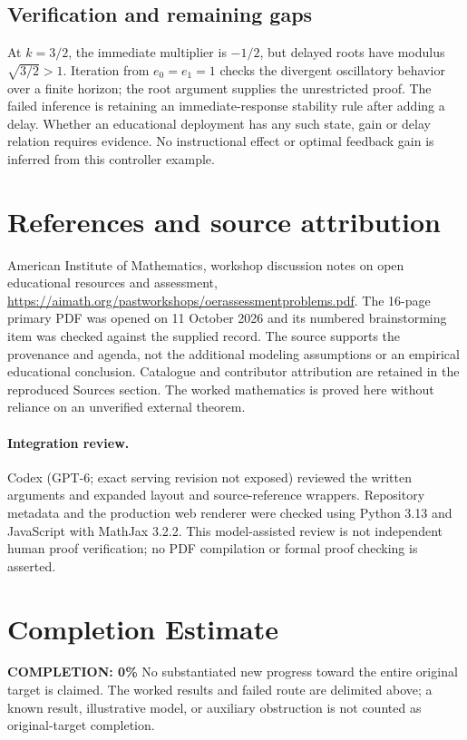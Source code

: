 \documentclass[11pt]{article}
\begin{document}
\subsection{Verification and remaining gaps}
At $k=3/2$, the immediate multiplier is $-1/2$, but delayed roots have modulus $\sqrt{3/2}>1$. Iteration from $e_0=e_1=1$ checks the divergent oscillatory behavior over a finite horizon; the root argument supplies the unrestricted proof. The failed inference is retaining an immediate-response stability rule after adding a delay. Whether an educational deployment has any such state, gain or delay relation requires evidence. No instructional effect or optimal feedback gain is inferred from this controller example.

\section{References and source attribution}
American Institute of Mathematics, workshop discussion notes on open educational resources and assessment, \url{https://aimath.org/pastworkshops/oerassessmentproblems.pdf}. The 16-page primary PDF was opened on 11 October 2026 and its numbered brainstorming item was checked against the supplied record. The source supports the provenance and agenda, not the additional modeling assumptions or an empirical educational conclusion. Catalogue and contributor attribution are retained in the reproduced Sources section. The worked mathematics is proved here without reliance on an unverified external theorem.


\paragraph{Integration review.} Codex (GPT-6; exact serving revision not exposed) reviewed the written arguments and expanded layout and source-reference wrappers. Repository metadata and the production web renderer were checked using Python 3.13 and JavaScript with MathJax 3.2.2. This model-assisted review is not independent human proof verification; no PDF compilation or formal proof checking is asserted.

\section{Completion Estimate}
\noindent\textbf{COMPLETION: 0\%}
No substantiated new progress toward the entire original target is claimed. The worked results and failed route are delimited above; a known result, illustrative model, or auxiliary obstruction is not counted as original-target completion.
\end{document}
